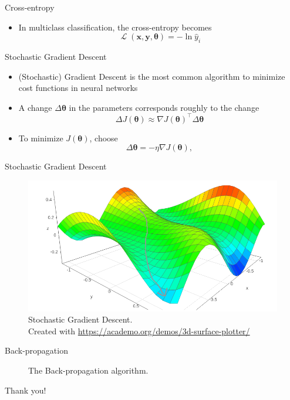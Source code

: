 \documentclass{beamer}
\DeclareMathOperator{\loss}{\mathcal{L}}
\begin{document}
	\begin{frame}{Cross-entropy}
		\begin{itemize}
			\item <1-> In multiclass classification, the cross-entropy becomes
			\begin{equation}
			\loss(\bm{x}, \bm{y}, \bm{\theta}) = -\ln \hat{y}_i
			\end{equation}
		\end{itemize}
	\end{frame}
	\begin{frame}{Stochastic Gradient Descent}
		\begin{itemize}
			\item <1-> (Stochastic) Gradient Descent is the most common algorithm to minimize cost functions in neural networks
			\item <2-> A change $\Delta \bm{\theta}$ in the parameters corresponds roughly to the change
			\begin{equation}
			\Delta J(\bm{\theta}) \approx \nabla J(\bm{\theta})^{\top}\Delta\bm{\theta}
			\end{equation}
			\item <3-> To minimize $J(\bm{\theta})$, choose
			\begin{equation}
			\Delta\bm{\theta} = -\eta\nabla J(\bm{\theta}),
			\end{equation}
		\end{itemize}
	\end{frame}
	\begin{frame}{Stochastic Gradient Descent}
		\begin{figure}
			\begin{center}
				\includegraphics[scale=.35]{fig/gradient_descent}
			\end{center}
			\caption{Stochastic Gradient Descent. \\Created with \url{https://academo.org/demos/3d-surface-plotter/}}
		\end{figure}
	\end{frame}
	\begin{frame}{Back-propagation}
		\begin{figure}
			\begin{center}
				
			\end{center}
			\caption{The Back-propagation algorithm.}
		\end{figure}
	\end{frame}
	
	\begin{frame}[standout]
	Thank you!
	\end{frame}
	
\end{document}
